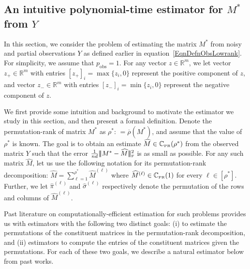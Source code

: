 \documentclass[11pt, hidelinks]{article} %
\newcommand{\matsnorm}[2]{|\!|\!| #1 | \! | \!|_{{#2}}}
\newcommand{\frobnorm}[1]{\ensuremath{\matsnorm{#1}{\mbox{\tiny{F}}}}}
\newcommand{\defn}{\ensuremath{:\,=}}
\newcommand{\reals}{\ensuremath{\mathbb{R}}}
\newcommand{\numrows}{n}
\newcommand{\numcols}{d}
\newcommand{\wtmatrix}{M}
\newcommand{\wtstar}{\wtmatrix^*}
\newcommand{\matrixset}{\mathbb{C}}
\newcommand{\wthat}{\widehat{\wtmatrix}}
\newcommand{\permset}{\matrixset_{\mbox{\tiny PR}}}
\newcommand{\permone}{\permset(1)}
\newcommand{\pp}{\ensuremath{p_{\mathrm{obs}}}}
\newcommand{\obs}{\ensuremath{Y}}
\newcommand{\permrank}{\rho}
\newcommand{\fnpermrank}[1]{\overline{\permrank}(#1)}
\newcommand{\permstar}{\permrank^*}
\begin{document}

\subsection{An intuitive polynomial-time estimator for $\wtstar$ from $\obs$}

In this section, we consider the problem of estimating the matrix
$\wtstar$ from noisy and partial observations $\obs$ as defined
earlier in equation~\eqref{EqnDefnObsLowrank}. For simplicity, we
assume that $\pp=1$.  For any vector $z \in \reals^m$, we let vector $z_+ \in \reals^m$ with entries $[z_+]_i = \max\{z_i, 0\}$ represent the positive component of $z$, and vector $z_- \in \reals^m$ with entries $[z_-]_i = \min\{z_i, 0\}$ represent the negative component of $z$. 
 
We first provide some intuition and background to motivate the estimator we study in this section, and then present a formal definition. Denote the permutation-rank of matrix $\wtstar$ as $\permstar \defn \fnpermrank{\wtstar}$, and assume that the value of $\permstar$ is known. The goal is to obtain an estimate $\wthat \in \permset(\permstar)$ from the observed matrix $\obs$ such that the error $\frac{1}{\numrows \numcols} \frobnorm{\wtstar - \wthat}^2$ is as small as possible. For any such matrix $\wthat$, let us use the following notation for its permutation-rank decomposition: $\wthat = \sum_{\ell = 1}^{\permstar} \wthat^{(\ell)}$ where $\wthat^{(\ell)} \in \permone$ for every $\ell \in [\permstar]$. Further, we let $\widehat{\pi}^{(\ell)}$ and
$\widehat{\sigma}^{(\ell)}$ respectively denote the permutation of the rows and columns of $\wthat^{(\ell)}$. 


Past literature on computationally-efficient estimation for such problems provides us with estimators with the following two distinct goals: (i)  to estimate the permutations of the constituent matrices in the permutation-rank decomposition, and (ii) estimators to compute the entries of the constituent matrices given the permutations. For each of these two goals, we describe a natural estimator below from past works.\\
\end{document}
